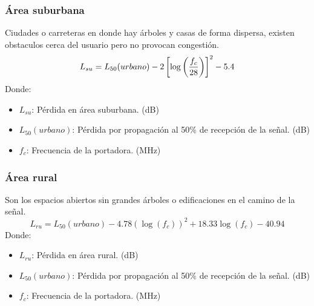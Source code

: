 \documentclass[
	12pt, %
	fleqn, %
	a4paper, %
	oneside, %
]{LegrandOrangeBook}
\begin{document}
\subsubsection{Área suburbana}
Ciudades o carreteras en donde hay árboles y casas de forma dispersa, existen obstaculos cerca del usuario pero no provocan congestión.
\begin{equation}
L_{su}=L_{50} (urbano) -2\left[\log\left(\frac{f_c}{28
}\right)\right]^2-5.4
\end{equation}
Donde:
\begin{itemize}
\item $L_{su}$: Pérdida en área suburbana. (dB)
\item $L_{50} (urbano)$: Pérdida por propagación al 50\% de recepción de la señal. (dB)
\item $f_c$: Frecuencia de la portadora. (MHz)
\end{itemize}
\subsubsection{Área rural}
Son los espacios abiertos sin grandes árboles o edificaciones en el camino de la señal.
\begin{equation}
L_{ru}=L_{50} (urbano)-4.78 (\log (f_c))^2+18.33\log(f_c)-40.94
\end{equation}
Donde:
\begin{itemize}
\item  $L_{ru}$: Pérdida en área rural. (dB)
\item $L_{50} (urbano)$: Pérdida por propagación al 50\% de recepción de la señal. (dB)
\item $f_c$: Frecuencia de la portadora. (MHz)
\end{itemize}
\end{document}
